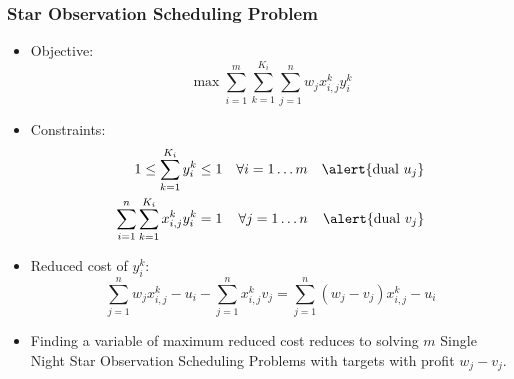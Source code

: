 \documentclass[10pt]{beamer}
\begin{document}
\begin{frame}
  \frametitle{Star Observation Scheduling Problem}

  \begin{itemize}
    \item Objective:
      \begin{displaymath}
        \max \sum_{i = 1}^m \sum_{k = 1}^{K_i} \sum_{j = 1}^n w_j x_{i, j}^k y_i^k
      \end{displaymath}

    \item Constraints:
      \begin{align*}
        1 \le \sum_{k = 1}^{K_i} y_i^k \le 1 && \forall i = 1 \dots m && \alert{\text{dual } u_j} \\
        \sum_{i = 1}^n \sum_{k = 1}^{K_i} x_{i, j}^k y_i^k = 1 && \forall j = 1 \dots n && \alert{\text{dual } v_j} \\
      \end{align*}

    \item \pause Reduced cost of $y_i^k$:
      \begin{displaymath}
        \sum_{j = 1}^n w_j x_{i, j}^k - u_i - \sum_{j = 1}^n x_{i, j}^k v_j
        = \sum_{j = 1}^n (w_j - v_j) x_{i, j}^k - u_i
      \end{displaymath}

    \item \pause Finding a variable of maximum reduced cost reduces to solving $m$ Single Night Star Observation Scheduling Problems with targets with profit $w_j - v_j$.
  \end{itemize}
\end{frame}
\end{document}
